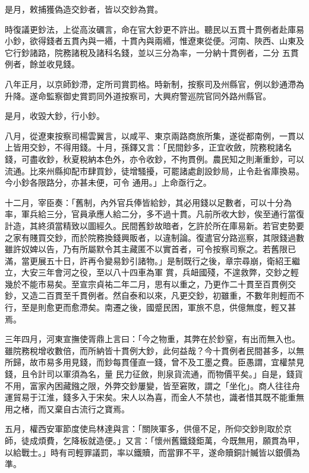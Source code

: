 \begin{pinyinscope}
 是月，敕捕獲偽造交鈔者，皆以交鈔為賞。



 時復議更鈔法，上從高汝礪言，命在官大鈔更不許出。聽民以五貫十貫例者赴庫易小鈔，欲得錢者五貫內與一緡，十貫內與兩緡，惟遼東從便。河南、陜西、山東及它行鈔諸路，院務諸稅及諸科名錢，並以三分為率，一分納十貫例者，二分
 五貫例者，餘並收見錢。



 八年正月，以京師鈔滯，定所司賞罰格。時新制，按察司及州縣官，例以鈔通滯為升降。遂命監察御史賞罰同外道按察司，大興府警巡院官同外路州縣官。



 是月，收毀大鈔，行小鈔。



 八月，從遼東按察司楊雲翼言，以咸平、東京兩路商旅所集，遂從都南例，一貫以上皆用交鈔，不得用錢。十月，孫鐸又言：「民間鈔多，正宜收斂，院務稅諸名錢，可盡收鈔，秋夏稅納本色外，亦令收鈔，不拘貫例。農民知之則漸重鈔，可以流通。比來州縣抑配市肆買鈔，徒增騷擾，可罷諸處創設鈔局，止令赴省庫換易。今小鈔各限路分，亦甚未便，可令
 通用。」上命亟行之。



 十二月，宰臣奏：「舊制，內外官兵俸皆給鈔，其必用錢以足數者，可以十分為率，軍兵給三分，官員承應人給二分，多不過十貫。凡前所收大鈔，俟至通行當復計造，其終須當精致以圖經久。民間舊鈔故暗者，乞許於所在庫易新。若官吏勢要之家有賤買交鈔，而於院務換錢興販者，以違制論。復遣官分路巡察，其限錢過數雖許奴婢以告，乃有所屬默令其主藏匿不以實首者，可令按察司察之。若舊限已滿，當更展五十日，許再令變易鈔引諸物。」是制既行之後，章宗尋崩，衛紹王繼立，大安三年會河之役，至以八十四車為軍
 賞，兵衄國殘，不遑救弊，交鈔之輕幾於不能市易矣。至宣宗貞祐二年二月，思有以重之，乃更作二十貫至百貫例交鈔，又造二百貫至千貫例者。然自泰和以來，凡更交鈔，初雖重，不數年則輕而不行，至是則愈更而愈滯矣。南遷之後，國蹙民困，軍旅不息，供億無度，輕又甚焉。



 三年四月，河東宣撫使胥鼎上言曰：「今之物重，其弊在於鈔窒，有出而無入也。雖院務稅增收數倍，而所納皆十貫例大鈔，此何益哉？今十貫例者民間甚多，以無所歸，故市易多用見錢，而鈔每貫僅直一錢，曾不及工墨之費。臣愚謂，宜權禁見錢，且令計司以軍須為名，量
 民力征斂，則泉貨流通，而物價平矣。」自是，錢貨不用，富家內困藏鏹之限，外弊交鈔屢變，皆至窘敗，謂之「坐化」。商人往往舟運貿易于江淮，錢多入于宋矣。宋人以為喜，而金人不禁也，識者惜其既不能重無用之楮，而又棄自古流行之寶焉。



 五月，權西安軍節度使烏林達與言：「關陜軍多，供億不足，所仰交鈔則取於京師，徒成煩費，乞降板就造便。」又言：「懷州舊鐵錢鉅萬，今既無用，願貫為甲，以給戰士。」時有司輕罪議罰，率以鐵贖，而當罪不平，遂命贖銅計贓皆以銀價為準。




\end{pinyinscope}

